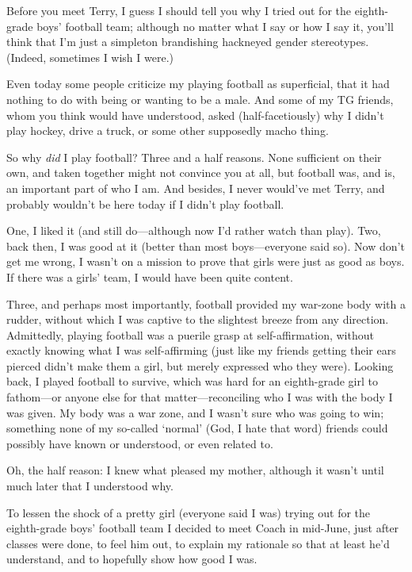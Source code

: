 \titlemark

Before you meet Terry, I guess I should tell you why I tried out for the
eighth-grade boys' football team; although no matter what I say or how I
say it, you'll think that I'm just a simpleton brandishing hackneyed
gender stereotypes. (Indeed, sometimes I wish I were.)

Even today some people criticize my playing football as superficial,
that it had nothing to do with being or wanting to be a male. And some
of my TG friends, whom you think would have understood, asked
(half-facetiously) why I didn't play hockey, drive a truck, or some
other supposedly macho thing.

So why \emph{did} I play football? Three and a half reasons. None
sufficient on their own, and taken together might not convince you at
all, but football was, and is, an important part of who I am. And
besides, I never would've met Terry, and probably wouldn't be here today
if I didn't play football.

One, I liked it (and still do---although now I'd rather watch than
play). Two, back then, I was good at it (better than most
boys---everyone said so). Now don't get me wrong, I wasn't on a mission
to prove that girls were just as good as boys. If there was a girls'
team, I would have been quite content.

Three, and perhaps most importantly, football provided my war-zone body
with a rudder, without which I was captive to the slightest breeze from
any direction. Admittedly, playing football was a puerile grasp at
self-affirmation, without exactly knowing what I was self-affirming
(just like my friends getting their ears pierced didn't make them a
girl, but merely expressed who they were). Looking back, I played
football to survive, which was hard for an eighth-grade girl to
fathom---or anyone else for that matter---reconciling who I was with the
body I was given. My body was a war zone, and I wasn't sure who was
going to win; something none of my so-called `normal' (God, I hate that
word) friends could possibly have known or understood, or even related
to.

Oh, the half reason: I knew what pleased my mother, although it wasn't
until much later that I understood why.

To lessen the shock of a pretty girl (everyone said I was) trying out
for the eighth-grade boys' football team I decided to meet Coach in
mid-June, just after classes were done, to feel him out, to explain my
rationale so that at least he'd understand, and to hopefully show how
good I was.

